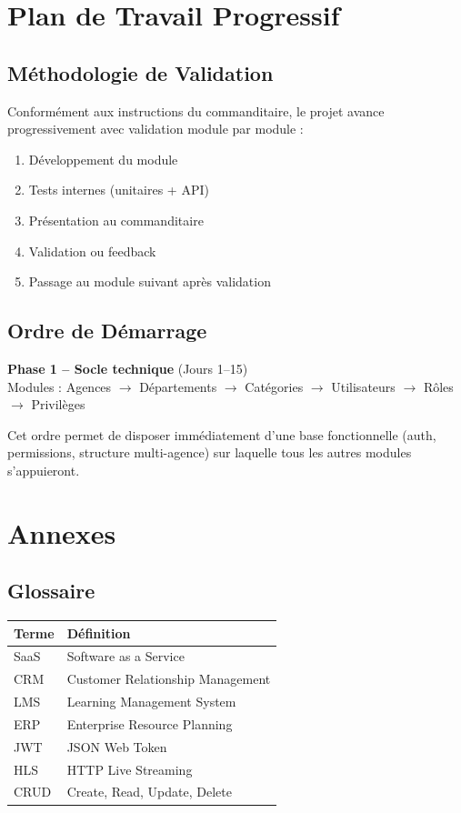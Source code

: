 \documentclass[12pt,a4paper]{report}
\begin{document}
\chapter{Plan de Travail Progressif}

\section{Méthodologie de Validation}
Conformément aux instructions du commanditaire, le projet avance progressivement avec validation module par module :
\begin{enumerate}
    \item Développement du module
    \item Tests internes (unitaires + API)
    \item Présentation au commanditaire
    \item Validation ou feedback
    \item Passage au module suivant après validation
\end{enumerate}

\section{Ordre de Démarrage}
\textbf{Phase 1 -- Socle technique} (Jours 1--15) \\
Modules : Agences $\rightarrow$ Départements $\rightarrow$ Catégories $\rightarrow$ Utilisateurs $\rightarrow$ Rôles $\rightarrow$ Privilèges

Cet ordre permet de disposer immédiatement d'une base fonctionnelle (auth, permissions, structure multi-agence) sur laquelle tous les autres modules s'appuieront.

\chapter{Annexes}

\section{Glossaire}
\begin{tabularx}{\textwidth}{l X}
    \toprule
    \textbf{Terme} & \textbf{Définition} \\
    \midrule
    SaaS & Software as a Service \\
    CRM & Customer Relationship Management \\
    LMS & Learning Management System \\
    ERP & Enterprise Resource Planning \\
    JWT & JSON Web Token \\
    HLS & HTTP Live Streaming \\
    CRUD & Create, Read, Update, Delete \\
    \bottomrule
\end{tabularx}
\end{document}
